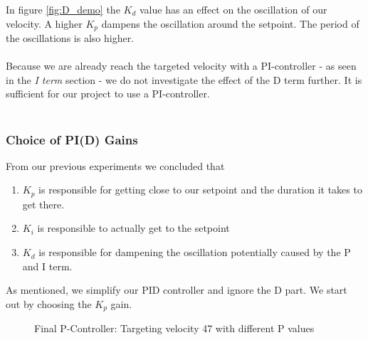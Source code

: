 \noindent
In figure \ref{fig:D_demo} the $K_d$ value has an effect on the oscillation of our velocity. A higher $K_p$ dampens the oscillation around the setpoint. The period of the oscillations is also higher.\\\\
Because we are already reach the targeted velocity with a PI-controller - as seen in the \textit{I term} section - we do not investigate the effect of the D term further. It is sufficient for our project to use a PI-controller.\\\\

\subsubsection{Choice of PI(D) Gains}
From our previous experiments we concluded that
\begin{enumerate}
    \item $K_p$ is responsible for getting close to our setpoint and the duration it takes to get there.
    \item $K_i$ is responsible to actually get to the setpoint
    \item $K_d$ is responsible for dampening the oscillation potentially caused by the P and I term.
\end{enumerate}

As mentioned, we simplify our PID controller and ignore the D part. We start out by choosing the $K_p$ gain.

\begin{figure}[H]
    \centering
{}
    \caption{Final P-Controller: Targeting velocity 47 with different P values} \label{fig:P_final}
\end{figure}
